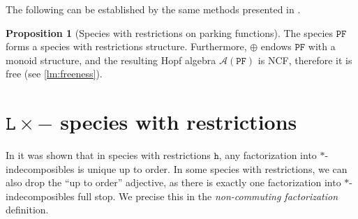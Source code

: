 \documentclass[submission]{FPSAC2023}
\theoremstyle{definition}
\newtheorem{prop}[thm]{Proposition}
\DeclareMathOperator{\End}{\mathrm{End}}
\begin{document}
\begin{figure}[h]
\centering
    \qquad
    \caption{\label{fig:restriction_parking}}%
\end{figure}

The following can be established by the same methods presented in \cite{Penaguiao2020}.

\begin{prop}[Species with restrictions on parking functions]
The species $\mathtt{PF}$ forms a species with restrictions structure.
Furthermore,  $\oplus $ endows $\mathtt{PF}$ with a monoid structure, and the resulting Hopf algebra $\mathcal A(\mathtt{PF})$ is NCF, therefore it is free (see \cref{lm:freeness}).
\end{prop}


\section{$\mathtt{L}\times -$ species with restrictions}

In \cite[Corollary 3.4.]{Penaguiao2020} it was shown that in species with restrictions $\mathtt{h}$, any factorization into $\ast$-indecomposibles is unique up to order.
In some species with restrictions, we can also drop the ``up to order'' adjective, as there is exactly one factorization into $\ast$-indecomposibles full stop. We precise this in the \textit{non-commuting factorization} definition.
\end{document}
